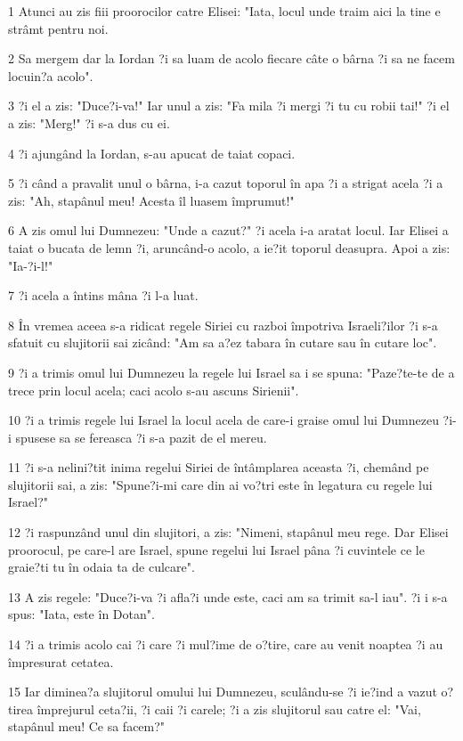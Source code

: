 \par 1 Atunci au zis fiii proorocilor catre Elisei: "Iata, locul unde traim aici la tine e strâmt pentru noi.
\par 2 Sa mergem dar la Iordan ?i sa luam de acolo fiecare câte o bârna ?i sa ne facem locuin?a acolo".
\par 3 ?i el a zis: "Duce?i-va!" Iar unul a zis: "Fa mila ?i mergi ?i tu cu robii tai!" ?i el a zis: "Merg!" ?i s-a dus cu ei.
\par 4 ?i ajungând la Iordan, s-au apucat de taiat copaci.
\par 5 ?i când a pravalit unul o bârna, i-a cazut toporul în apa ?i a strigat acela ?i a zis: "Ah, stapânul meu! Acesta îl luasem împrumut!"
\par 6 A zis omul lui Dumnezeu: "Unde a cazut?" ?i acela i-a aratat locul. Iar Elisei a taiat o bucata de lemn ?i, aruncând-o acolo, a ie?it toporul deasupra. Apoi a zis: "Ia-?i-l!"
\par 7 ?i acela a întins mâna ?i l-a luat.
\par 8 În vremea aceea s-a ridicat regele Siriei cu razboi împotriva Israeli?ilor ?i s-a sfatuit cu slujitorii sai zicând: "Am sa a?ez tabara în cutare sau în cutare loc".
\par 9 ?i a trimis omul lui Dumnezeu la regele lui Israel sa i se spuna: "Paze?te-te de a trece prin locul acela; caci acolo s-au ascuns Sirienii".
\par 10 ?i a trimis regele lui Israel la locul acela de care-i graise omul lui Dumnezeu ?i-i spusese sa se fereasca ?i s-a pazit de el mereu.
\par 11 ?i s-a nelini?tit inima regelui Siriei de întâmplarea aceasta ?i, chemând pe slujitorii sai, a zis: "Spune?i-mi care din ai vo?tri este în legatura cu regele lui Israel?"
\par 12 ?i raspunzând unul din slujitori, a zis: "Nimeni, stapânul meu rege. Dar Elisei proorocul, pe care-l are Israel, spune regelui lui Israel pâna ?i cuvintele ce le graie?ti tu în odaia ta de culcare".
\par 13 A zis regele: "Duce?i-va ?i afla?i unde este, caci am sa trimit sa-l iau". ?i i s-a spus: "Iata, este în Dotan".
\par 14 ?i a trimis acolo cai ?i care ?i mul?ime de o?tire, care au venit noaptea ?i au împresurat cetatea.
\par 15 Iar diminea?a slujitorul omului lui Dumnezeu, sculându-se ?i ie?ind a vazut o?tirea împrejurul ceta?ii, ?i caii ?i carele; ?i a zis slujitorul sau catre el: "Vai, stapânul meu! Ce sa facem?"
